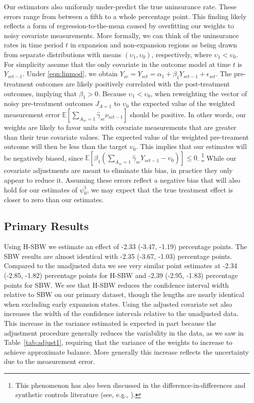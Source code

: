 \documentclass[aoas]{imsart}
\theoremstyle{plain}
\theoremstyle{remark}
\begin{document}
Our estimators also uniformly under-predict the true uninsurance rate. These errors range from between a fifth to a whole percentage point. This finding likely reflects a form of regression-to-the-mean caused by overfitting our weights to noisy covariate measurements. More formally, we can think of the uninsurance rates in time period $t$ in expansion and non-expansion regions as being drawn from separate distributions with means $(\upsilon_1, \upsilon_0)$, respectively, where $\upsilon_1 < \upsilon_0$. For simplicity assume that the only covariate in the outcome model at time $t$ is $Y_{sct-1}$. Under \eqref{eqn:linmod}, we obtain $Y_{sc} = Y_{sct} = \alpha_1 + \beta_1Y_{sct-1} + \epsilon_{sct}$. The pre-treatment outcomes are likely positively correlated with the post-treatment outcomes, implying that $\beta_1 > 0$. Because $\upsilon_1 < \upsilon_0$, when reweighting the vector of noisy pre-treatment outcomes $J_{A=1}$ to $\upsilon_0$ the expected value of the weighted measurement error $\mathbb{E}[\sum_{A_{sc} = 1}\hat{\gamma}_{sc}\nu_{sct-1}]$ should be positive. In other words, our weights are likely to favor units with covariate measurements that are greater than their true covariate values. The expected value of the weighted pre-treament outcome will then be less than the target $\upsilon_0$. This implies that our estimates will be negatively biased, since $\mathbb{E}[\beta_1(\sum_{A_{sc} = 1}\hat{\gamma}_{sc}Y_{sct-1} - \upsilon_0)] \le 0$. \footnote{This phenomenon has also been discussed in the difference-in-differences and synthetic controls literature (see, e.g., \cite{daw2018matching}).} While our covariate adjustments are meant to eliminate this bias, in practice they only appear to reduce it. Assuming these errors reflect a negative bias that will also hold for our estimates of $\psi^1_0$, we may expect that the true treatment effect is closer to zero than our estimates. 

\subsection{Primary Results}

Using H-SBW we estimate an effect of -2.33 (-3.47, -1.19) percentage points. The SBW results are almost identical with -2.35 (-3.67, -1.03) percentage points. Compared to the unadjusted data we see very similar point estimates at -2.34 (-2.85, -1.82) percentage points for H-SBW and -2.39 (-2.95, -1.83) percentage points for SBW. We see that H-SBW reduces the confidence interval width relative to SBW on our primary dataset, though the lengths are nearly identical when excluding early expansion states. Using the adjusted covariate set also increases the width of the confidence intervals relative to the unadjusted data. This increase in the variance estimated is expected in part because the adjustment procedure generally reduces the variability in the data, as we saw in Table~\ref{tab:adjust1}, requiring that the variance of the weights to increase to achieve approximate balance. More generally this increase reflects the uncertainty due to the measurement error.
\end{document}
